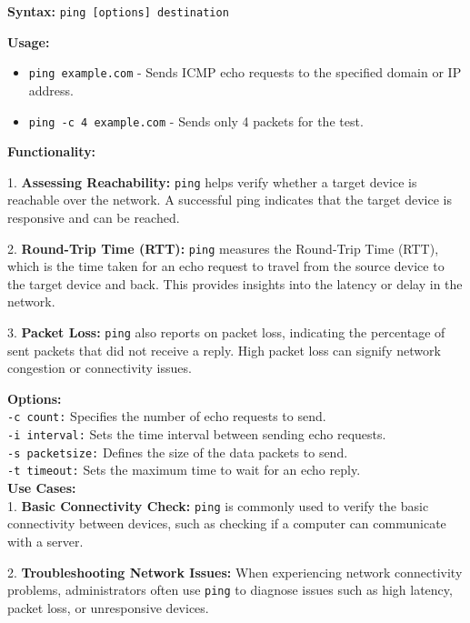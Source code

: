 \documentclass[11pt]{report}
\begin{document}
\textbf{Syntax:}
\texttt{ping [options] destination}
\vspace{\baselineskip}

\textbf{Usage:}
\begin{itemize}
    \item \texttt{ping example.com} - Sends ICMP echo requests to the specified domain or IP address.
    \item \texttt{ping -c 4 example.com} - Sends only 4 packets for the test.
\end{itemize}

\vspace{\baselineskip}

\textbf{Functionality:}

1. \textbf{Assessing Reachability:} \texttt{ping} helps verify whether a target device is reachable over the network. A successful ping indicates that the target device is responsive and can be reached.

2. \textbf{Round-Trip Time (RTT):} \texttt{ping} measures the Round-Trip Time (RTT), which is the time taken for an echo request to travel from the source device to the target device and back. This provides insights into the latency or delay in the network.

3. \textbf{Packet Loss:} \texttt{ping} also reports on packet loss, indicating the percentage of sent packets that did not receive a reply. High packet loss can signify network congestion or connectivity issues.

\vspace{\baselineskip}

\textbf{Options:} \\
\texttt{-c count:} Specifies the number of echo requests to send.\\
\texttt{-i interval:} Sets the time interval between sending echo requests.\\
\texttt{-s packetsize:} Defines the size of the data packets to send.\\
\texttt{-t timeout:} Sets the maximum time to wait for an echo reply.\\

\textbf{Use Cases:} \\
1. \textbf{Basic Connectivity Check:} \texttt{ping} is commonly used to verify the basic connectivity between devices, such as checking if a computer can communicate with a server.

2. \textbf{Troubleshooting Network Issues:} When experiencing network connectivity problems, administrators often use \texttt{ping} to diagnose issues such as high latency, packet loss, or unresponsive devices.
\end{document}

